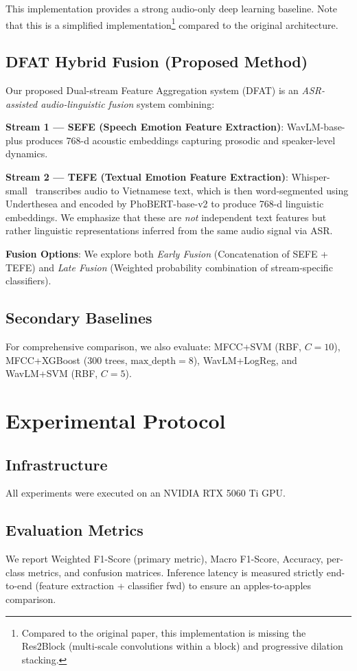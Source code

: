 \documentclass[12pt,a4paper]{report}
\begin{document}
This implementation provides a strong audio-only deep learning baseline. Note that this is a simplified implementation\footnote{Compared to the original paper, this implementation is missing the Res2Block (multi-scale convolutions within a block) and progressive dilation stacking.} compared to the original architecture.

\section{DFAT Hybrid Fusion (Proposed Method)}
Our proposed Dual-stream Feature Aggregation system (DFAT) is an \emph{ASR-assisted audio-linguistic fusion} system combining:

\textbf{Stream 1 --- SEFE (Speech Emotion Feature Extraction)}: WavLM-base-plus produces 768-d acoustic embeddings capturing prosodic and speaker-level dynamics.

\textbf{Stream 2 --- TEFE (Textual Emotion Feature Extraction)}: Whisper-small~\cite{whisper} transcribes audio to Vietnamese text, which is then word-segmented using Underthesea and encoded by PhoBERT-base-v2 to produce 768-d linguistic embeddings. We emphasize that these are \emph{not} independent text features but rather linguistic representations inferred from the same audio signal via ASR.

\textbf{Fusion Options}: We explore both \emph{Early Fusion} (Concatenation of SEFE + TEFE) and \emph{Late Fusion} (Weighted probability combination of stream-specific classifiers).

\section{Secondary Baselines}
For comprehensive comparison, we also evaluate: MFCC+SVM (RBF, $C=10$), MFCC+XGBoost (300 trees, $\text{max\_depth}=8$), WavLM+LogReg, and WavLM+SVM (RBF, $C=5$).

\chapter{Experimental Protocol}

\section{Infrastructure}
All experiments were executed on an NVIDIA RTX 5060 Ti GPU.

\section{Evaluation Metrics}
We report Weighted F1-Score (primary metric), Macro F1-Score, Accuracy, per-class metrics, and confusion matrices. Inference latency is measured strictly end-to-end (feature extraction + classifier fwd) to ensure an apples-to-apples comparison.
\end{document}
